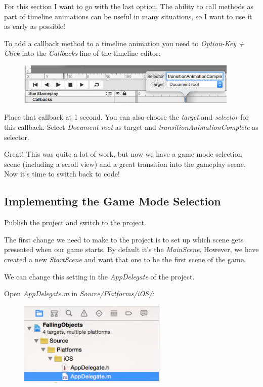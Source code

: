 For this section I want to go with the last option. The ability to call methods
as part of timeline animations can be useful in many situations, so I want to
use it as early as possible!

\begin{leftbar}
To add a callback method to a timeline animation you need to \textit{Option-Key
+ Click} into the \textit{Callbacks} line of the timeline editor:

\begin{figure}[H]
		\centering
		\includegraphics[width=300pt]{images/Chapter7/timeline_callback.png}
\end{figure}
Place that callback at 1 second. You can also choose the \textit{target} and
\textit{selector} for this callback. Select \textit{Document root} as target and
\textit{transitionAnimationComplete} as selector.
\end{leftbar}

Great! This was quite a lot of work, but now we have a game mode selection
scene (including a scroll view) and a great transition into the gameplay scene.
Now it's time to switch back to code!

\subsection{Implementing the Game Mode Selection}

\begin{leftbar}
Publish the \SB{} project and switch to the \xcode{} project.
\end{leftbar}

The first change we need to make to the \xcode{} project is to set up which
scene gets presented when our game starts. By default it's
the \textit{MainScene}. However, we have created a new \textit{StartScene} and want
that one to be the first scene of the game.

We can change this setting in the \textit{AppDelegate} of the project. 
\begin{leftbar}
Open \textit{AppDelegate.m} in \textit{Source/Platforms/iOS/}:
\begin{figure}[H]
		\centering
		\includegraphics[width=200pt]{images/Chapter7/app_delegate.png}
\end{figure}
\end{leftbar}


